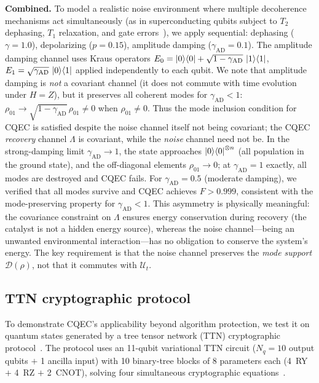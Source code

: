 \documentclass[prx,twocolumn,superscriptaddress,longbibliography,floatfix]{revtex4-2}
\begin{document}
\textbf{Combined.}
To model a realistic noise environment where multiple decoherence mechanisms act simultaneously (as in superconducting qubits subject to $T_2$ dephasing, $T_1$ relaxation, and gate errors~\cite{NielsenChuang2010}), we apply sequential: dephasing ($\gamma = 1.0$), depolarizing ($p = 0.15$), amplitude damping ($\gamma_\mathrm{AD} = 0.1$).
The amplitude damping channel uses Kraus operators $E_0 = \ket{0}\!\bra{0} + \sqrt{1-\gamma_\mathrm{AD}}\,\ket{1}\!\bra{1}$, $E_1 = \sqrt{\gamma_\mathrm{AD}}\,\ket{0}\!\bra{1}$ applied independently to each qubit.
We note that amplitude damping is \emph{not} a covariant channel (it does not commute with time evolution under $H = Z$), but it preserves all coherent modes for $\gamma_\mathrm{AD} < 1$: $\rho_{01} \to \sqrt{1-\gamma_\mathrm{AD}}\,\rho_{01} \neq 0$ when $\rho_{01} \neq 0$.
Thus the mode inclusion condition for CQEC is satisfied despite the noise channel itself not being covariant; the CQEC \emph{recovery} channel $\Lambda$ is covariant, while the \emph{noise} channel need not be.
In the strong-damping limit $\gamma_\mathrm{AD} \to 1$, the state approaches $\ket{0}\!\bra{0}^{\otimes n}$ (all population in the ground state), and the off-diagonal elements $\rho_{01} \to 0$; at $\gamma_\mathrm{AD} = 1$ exactly, all modes are destroyed and CQEC fails.
For $\gamma_\mathrm{AD} = 0.5$ (moderate damping), we verified that all modes survive and CQEC achieves $F > 0.999$, consistent with the mode-preserving property for $\gamma_\mathrm{AD} < 1$.
This asymmetry is physically meaningful: the covariance constraint on $\Lambda$ ensures energy conservation during recovery (the catalyst is not a hidden energy source), whereas the noise channel---being an unwanted environmental interaction---has no obligation to conserve the system's energy.
The key requirement is that the noise channel preserves the \emph{mode support} $\mathcal{D}(\rho)$, not that it commutes with $\mathcal{U}_t$.


\subsection{TTN cryptographic protocol}
\label{sec:ttn}

To demonstrate CQEC's applicability beyond algorithm protection, we test it on quantum states generated by a tree tensor network (TTN) cryptographic protocol~\cite{Huggins2019,Sim2019}.
The protocol uses an 11-qubit variational TTN circuit ($N_q = 10$ output qubits $+$ 1 ancilla input) with 10 binary-tree blocks of 8 parameters each (4~RY $+$ 4~RZ $+$ 2~CNOT), solving four simultaneous cryptographic equations~\cite{Sim2019}.
\end{document}
